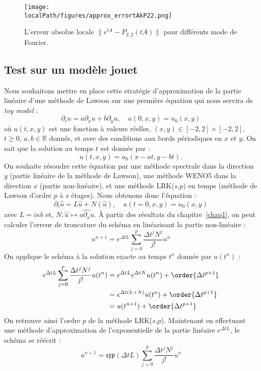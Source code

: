 \begin{figure}
  \centering
  \texttt{[image: \\localPath/figures/approx\_errortAkP22.png]}
  \caption{L'erreur absolue locale $\|e^{tA}-P_{2,2}(tA)\|$ pour différents mode de Fourier.}
  \label{fig:pade:error22}
\end{figure}


\subsection{Test sur un modèle jouet}

Nous souhaitons mettre en place cette stratégie d'approximation de la partie linéaire d'une méthode de Lawson sur une première équation qui nous servira de \emph{toy model} :
$$
  \partial_t u = a\partial_x u + b\partial_y u,\quad u(0,x,y)=u_0(x,y)
$$
où $u(t,x,y)$ est une fonction à valeurs réelles, $(x,y)\in[-2,2]\times[-2,2]$, $t\geq0$, $a,b\in\mathbb{R}$ donnés, et avec des conditions aux bords périodiques en $x$ et $y$. On sait que la solution au temps $t$ est donnée par :
$$
  u(t,x,y) = u_0(x-at,y-bt).
$$
On souhaite résoudre cette équation par une méthode spectrale dans la direction $y$ (partie linéaire de la méthode de Lawson), une méthode WENO5 dans la direction $x$ (partie non-linéaire), et une méthode LRK($s$,$p$) en temps (méthode de Lawson d'ordre $p$ à $s$ étages). Nous obtenons donc l'équation :
$$
  \partial_t \hat{u} = L\hat{u} + N(\hat{u}),\quad u(t=0,x,y) = u_0(x,y)
$$
avec $L = i\kappa b$ et, $N:\hat{u}\mapsto\widehat{a\partial_xu}$. À partir des résultats du chapitre~\ref{chap1}, on peut calculer l'erreur de troncature du schéma en linéarisant la partie non-linéaire :
$$
  u^{n+1} = e^{\Delta tL}\sum_{j=0}^{p}\frac{\Delta t^jN^j}{j!}u^n
$$
On applique le schéma à la solution exacte au temps $t^n$ donnée par $u(t^n)$ :
$$
  \begin{aligned}
    e^{\Delta tL}\sum_{j=0}^{p}\frac{\Delta t^jN^j}{j!}u(t^n) &= e^{\Delta t L}e^{\Delta t N}u(t^n) + \order{\Delta t^{p+1}} \\
      &= e^{\Delta t(L+N)}u(t^n) + \order{\Delta t^{p+1}} \\
      &= u(t^{n+1}) + \order{\Delta t^{p+1}}
  \end{aligned}
$$
On retrouve ainsi l'ordre $p$ de la méthode LRK($s$,$p$). Maintenant en effectuant une méthode d'approximation de l'exponentielle de la partie linéaire $e^{\Delta tL}$, le schéma se réécrit :
$$
  u^{n+1} = \mathfrak{exp}(\Delta tL)\sum_{j=0}^{p}\frac{\Delta t^jN^j}{j!}u^n
$$

